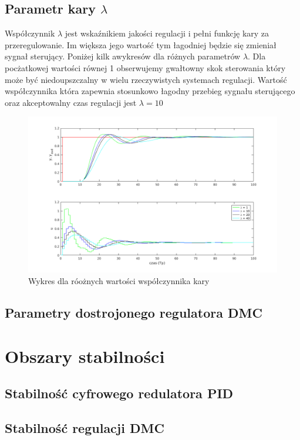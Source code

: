 \documentclass[a4paper, 11pt]{article}
\begin{document}
\subsection{Parametr kary $\lambda$}
Współczynnik $\lambda$ jest wskaźnikiem jakości regulacji i pełni funkcję kary za przeregulowanie. Im większa jego wartość tym łagodniej będzie się zmieniał sygnał sterujący. Poniżej kilk awykresów dla różnych parametrów $\lambda$. Dla pocżatkowej wartości równej 1 obserwujemy gwałtowny skok sterowania który może być niedoupszczalny w wielu rzeczywistych systemach regulacji. Wartość współczynnika która zapewnia stosunkowo łagodny przebieg sygnału sterującego oraz akceptowalny czas regulacji jest $\lambda = 10$
\begin{figure}[H]
\centering
\includegraphics[scale=0.60]{lambda_dmc.png}
\caption{Wykres dla róożnych wartości współczynnika kary}
\label{}
\end{figure}
\subsection{Parametry dostrojonego regulatora DMC}

\section{Obszary stabilności}
\subsection{Stabilność cyfrowego redulatora PID} 
\subsection{Stabilność regulacji DMC}
\end{document}
